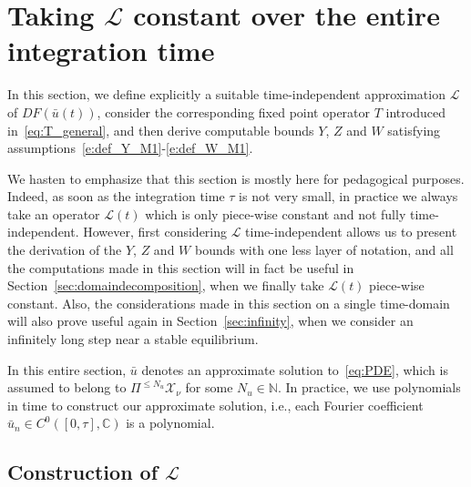 \documentclass[10pt,a4paper]{article}
\theoremstyle{plain}
\newcommand{\CC}{\mathbb C}
\newcommand{\NN}{\mathbb N}
\renewcommand{\L}{\mathcal{L}}
\newcommand{\X}{\mathcal{X}}
\newcommand{\bu}{\bar{u}}
\newcommand{\1}{\mathbf{1}}
\newcommand{\Nu}{N_{u}}
\begin{document}
\section{Taking $\L$ constant over the entire integration time}
\label{sec:onedomain}



In this section, we define explicitly a suitable time-independent approximation $\L$ of $DF(\bu(t))$, consider the corresponding fixed point operator $T$ introduced in~\eqref{eq:T_general}, and then derive computable bounds $Y$, $Z$ and $W$ satisfying assumptions~\eqref{e:def_Y_M1}-\eqref{e:def_W_M1}.

We hasten to emphasize that this section is mostly here for pedagogical purposes. Indeed, as soon as the integration time $\tau$ is not very small, in practice we always take an operator $\L(t)$ which is only piece-wise constant and not fully time-independent. However, first considering $\L$ time-independent allows us to present the derivation of the $Y$, $Z$ and $W$ bounds with one less layer of notation, and all the computations made in this section will in fact be useful in Section~\ref{sec:domaindecomposition}, when we finally take $\L(t)$ piece-wise constant. Also, the considerations made in this section on a single time-domain will also prove useful again in Section~\ref{sec:infinity}, when we consider an infinitely long step near a stable equilibrium.

In this entire section, $\bu$ denotes an approximate solution to~\eqref{eq:PDE}, which is assumed to belong to $\Pi^{\leq \Nu} \X_\nu$ for some $\Nu\in\NN$. In practice, we use polynomials in time to construct our approximate solution, i.e., each Fourier coefficient $\bu_n\in C^0{([0,\tau],\CC)}$ is a polynomial.

\subsection{Construction of $\L$}
\label{sec:L_onedomain}
\end{document}
